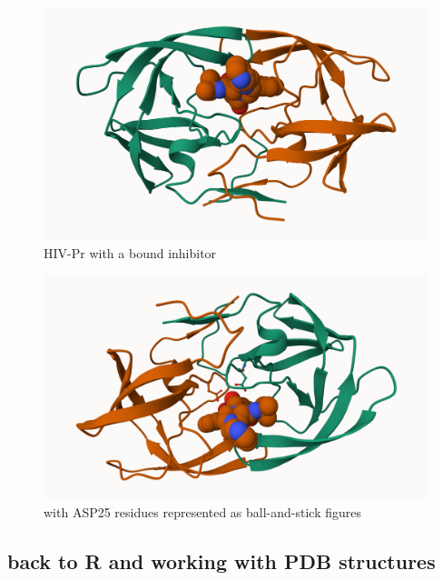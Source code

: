 \documentclass[
  letterpaper,
  DIV=11,
  numbers=noendperiod]{scrartcl}
\begin{document}
\begin{figure}

{\centering \includegraphics{1HSG.png}

}

\caption{HIV-Pr with a bound inhibitor}

\end{figure}

\begin{figure}

{\centering \includegraphics{1HSG copy.png}

}

\caption{with ASP25 residues represented as ball-and-stick figures}

\end{figure}

\hypertarget{back-to-r-and-working-with-pdb-structures}{%
\subsection{back to R and working with PDB
structures}\label{back-to-r-and-working-with-pdb-structures}}
\end{document}
